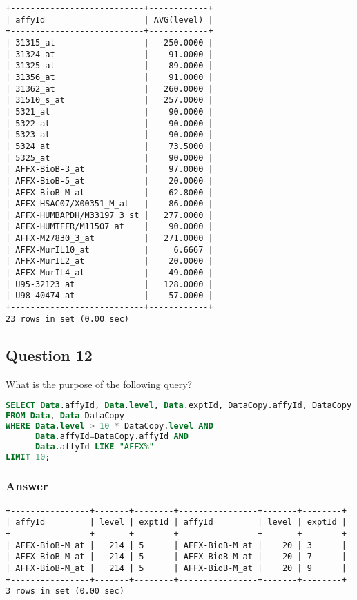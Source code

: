 \begin{lstlisting}[style=output]
+---------------------------+------------+
| affyId                    | AVG(level) |
+---------------------------+------------+
| 31315_at                  |   250.0000 |
| 31324_at                  |    91.0000 |
| 31325_at                  |    89.0000 |
| 31356_at                  |    91.0000 |
| 31362_at                  |   260.0000 |
| 31510_s_at                |   257.0000 |
| 5321_at                   |    90.0000 |
| 5322_at                   |    90.0000 |
| 5323_at                   |    90.0000 |
| 5324_at                   |    73.5000 |
| 5325_at                   |    90.0000 |
| AFFX-BioB-3_at            |    97.0000 |
| AFFX-BioB-5_at            |    20.0000 |
| AFFX-BioB-M_at            |    62.8000 |
| AFFX-HSAC07/X00351_M_at   |    86.0000 |
| AFFX-HUMBAPDH/M33197_3_st |   277.0000 |
| AFFX-HUMTFFR/M11507_at    |    90.0000 |
| AFFX-M27830_3_at          |   271.0000 |
| AFFX-MurIL10_at           |     6.6667 |
| AFFX-MurIL2_at            |    20.0000 |
| AFFX-MurIL4_at            |    49.0000 |
| U95-32123_at              |   128.0000 |
| U98-40474_at              |    57.0000 |
+---------------------------+------------+
23 rows in set (0.00 sec)
\end{lstlisting}


\subsection*{Question 12}
What is the purpose of the following query?

\begin{lstlisting}[language=sql]
SELECT Data.affyId, Data.level, Data.exptId, DataCopy.affyId, DataCopy.level, DataCopy.exptId
FROM Data, Data DataCopy
WHERE Data.level > 10 * DataCopy.level AND
      Data.affyId=DataCopy.affyId AND
      Data.affyId LIKE "AFFX%"
LIMIT 10;
\end{lstlisting}

\subsubsection*{Answer}

\begin{lstlisting}[style=output]
+----------------+-------+--------+----------------+-------+--------+
| affyId         | level | exptId | affyId         | level | exptId |
+----------------+-------+--------+----------------+-------+--------+
| AFFX-BioB-M_at |   214 | 5      | AFFX-BioB-M_at |    20 | 3      |
| AFFX-BioB-M_at |   214 | 5      | AFFX-BioB-M_at |    20 | 7      |
| AFFX-BioB-M_at |   214 | 5      | AFFX-BioB-M_at |    20 | 9      |
+----------------+-------+--------+----------------+-------+--------+
3 rows in set (0.00 sec)
\end{lstlisting}

